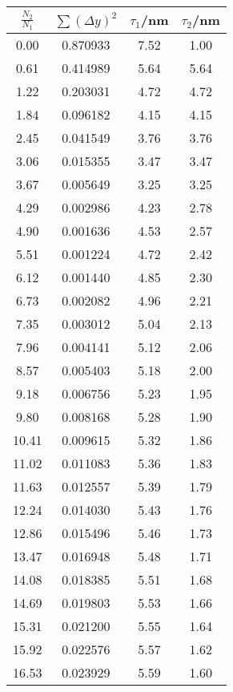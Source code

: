 \begin{center}
    \begin{tabular}{c | c c c}
        $\frac{N_2}{N_1}$ & $\sum(\Delta y)^2$ &  $\tau_1$/nm & $\tau_2$/nm \\
        \hline
         0.00 &  0.870933 &  7.52 &  1.00 \\
         0.61 &  0.414989 &  5.64 &  5.64 \\
         1.22 &  0.203031 &  4.72 &  4.72 \\
         1.84 &  0.096182 &  4.15 &  4.15 \\
         2.45 &  0.041549 &  3.76 &  3.76 \\
         3.06 &  0.015355 &  3.47 &  3.47 \\
         3.67 &  0.005649 &  3.25 &  3.25 \\
         4.29 &  0.002986 &  4.23 &  2.78 \\
         4.90 &  0.001636 &  4.53 &  2.57 \\
         5.51 &  0.001224 &  4.72 &  2.42 \\
         6.12 &  0.001440 &  4.85 &  2.30 \\
         6.73 &  0.002082 &  4.96 &  2.21 \\
         7.35 &  0.003012 &  5.04 &  2.13 \\
         7.96 &  0.004141 &  5.12 &  2.06 \\
         8.57 &  0.005403 &  5.18 &  2.00 \\
         9.18 &  0.006756 &  5.23 &  1.95 \\
         9.80 &  0.008168 &  5.28 &  1.90 \\
        10.41 &  0.009615 &  5.32 &  1.86 \\
        11.02 &  0.011083 &  5.36 &  1.83 \\
        11.63 &  0.012557 &  5.39 &  1.79 \\
        12.24 &  0.014030 &  5.43 &  1.76 \\
        12.86 &  0.015496 &  5.46 &  1.73 \\
        13.47 &  0.016948 &  5.48 &  1.71 \\
        14.08 &  0.018385 &  5.51 &  1.68 \\
        14.69 &  0.019803 &  5.53 &  1.66 \\
        15.31 &  0.021200 &  5.55 &  1.64 \\
        15.92 &  0.022576 &  5.57 &  1.62 \\
        16.53 &  0.023929 &  5.59 &  1.60 \\

\end{tabular}
\end{center}
